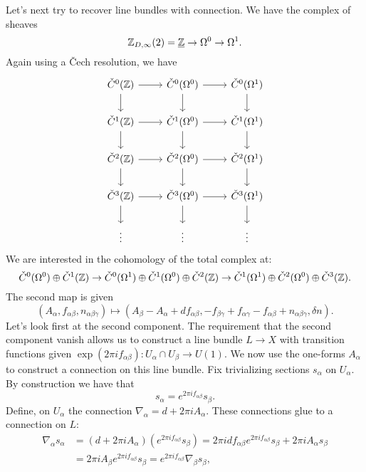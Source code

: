 \documentclass{amsart}
\begin{document}
Let's next try to recover line bundles with connection. We have the complex of sheaves
\begin{equation*}
    \mathbb{Z}_{D,\infty}(2) = \underline{\mathbb{Z}}\to \Omega^0\to \Omega^1.
\end{equation*}
Again using a \v Cech resolution, we have
\begin{equation*}
    \begin{tikzcd}
        \check C^0(\Z) \rar\dar & \check C^0(\Omega^0)\dar\rar & \check C^0(\Omega^1)\dar\\
        \check C^1(\Z) \rar\dar & \check C^1(\Omega^0)\dar\rar & \check C^1(\Omega^1)\dar\\
        \check C^2(\Z) \rar\dar & \check C^2(\Omega^0)\dar\rar & \check C^2(\Omega^1)\dar\\
        \check C^3(\Z) \rar\dar & \check C^3(\Omega^0)\dar\rar & \check C^3(\Omega^1)\dar\\
        \vdots & \vdots & \vdots
    \end{tikzcd}
\end{equation*}
We are interested in the cohomology of the total complex at:
\begin{equation*}
    \check C^0(\Omega^0)\oplus \check C^1(\mathbb{Z}) \to \check C^0(\Omega^1)\oplus \check C^1(\Omega^0)
    \oplus \check C^2(\mathbb{Z}) \to \check C^1(\Omega^1) \oplus \check C^2(\Omega^0)\oplus \check C^3(\mathbb{Z}).
\end{equation*}
The second map is given
\begin{equation*}
    (A_\alpha, f_{\alpha\beta}, n_{\alpha\beta\gamma}) \mapsto (A_\beta-A_\alpha + df_{\alpha\beta},
    -f_{\beta\gamma} + f_{\alpha\gamma} - f_{\alpha\beta} + n_{\alpha\beta\gamma}, \delta n).
\end{equation*}
Let's look first at the second component. The requirement that the second component vanish
allows us to construct a line bundle $L\to X$ with transition functions given
$\exp(2\pi i f_{\alpha\beta}):U_\alpha\cap U_\beta\to U(1)$. We now use the one-forms $A_\alpha$
to construct a connection on this line bundle. Fix trivializing sections $s_\alpha$ on $U_\alpha$.
By construction we have that
\begin{equation*}
    s_\alpha = e^{2\pi i f_{\alpha\beta}} s_\beta.
\end{equation*}
Define, on $U_\alpha$ the connection $\nabla_\alpha = d + 2\pi i A_\alpha$. These connections
glue to a connection on $L$: 
\begin{align*}
    \nabla_\alpha s_\alpha &= (d+2\pi iA_\alpha)(e^{2\pi i f_{\alpha\beta}}s_\beta) = 2\pi idf_{\alpha\beta}e^{2\pi if_{\alpha\beta}}s_\beta
    + 2\pi iA_\alpha s_\beta \\
    &= 2\pi iA_\beta e^{2\pi i f_{\alpha\beta}}s_\beta = e^{2\pi if_{\alpha\beta}}\nabla_\beta s_\beta,
\end{align*}
\end{document}
